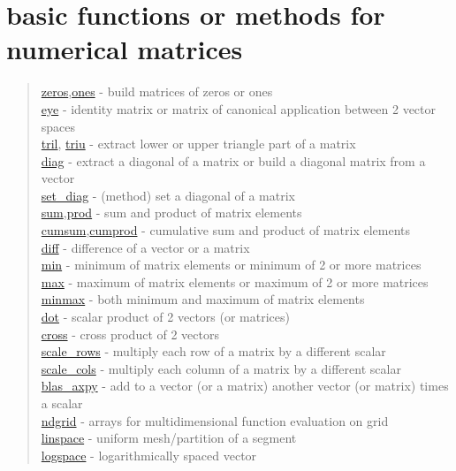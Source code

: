 \chapter*{basic functions or methods for numerical matrices}
\hypertarget{basicnumarrays}{}
\begin{quote}
\noindent
\hyperlink{zeros}{zeros},\hyperlink{ones}{ones} - build matrices of zeros or ones \\
\hyperlink{eye}{eye} - identity matrix or matrix of canonical application between 2 vector spaces \\
\hyperlink{tril}{tril}, \hyperlink{triu}{triu} - extract lower or upper triangle part of a matrix \\
\hyperlink{diag}{diag} - extract a diagonal of a matrix or build a diagonal matrix from a vector \\
\hyperlink{set_diag}{set\_diag} - (method) set a diagonal of a matrix \\
\hyperlink{sum}{sum},\hyperlink{prod}{prod} - sum and product of matrix elements \\
\hyperlink{cumsum}{cumsum},\hyperlink{cumprod}{cumprod} - cumulative sum and product of matrix elements \\
\hyperlink{diff}{diff} - difference of a vector or a matrix \\
\hyperlink{min}{min} - minimum of matrix elements or minimum of 2 or more matrices \\
\hyperlink{max}{max} - maximum of matrix elements or maximum of 2 or more matrices \\
\hyperlink{minmax}{minmax} - both minimum and maximum of matrix elements\\
\hyperlink{dot}{dot} - scalar product of 2 vectors (or matrices) \\
\hyperlink{cross}{cross} - cross product of 2 vectors \\
\hyperlink{scale_rows}{scale\_rows} - multiply each row of a matrix by a different scalar \\
\hyperlink{scale_cols}{scale\_cols} - multiply each column of a matrix by a different scalar \\
\hyperlink{blas_axpy}{blas\_axpy} -  add to a vector (or a matrix) another vector (or matrix) times a scalar\\ 
\hyperlink{ndgrid}{ndgrid} - arrays for multidimensional function evaluation on grid \\
\hyperlink{linspace}{linspace} - uniform mesh/partition of a segment \\
\hyperlink{logspace}{logspace} - logarithmically spaced vector \\
\end{quote}
 
